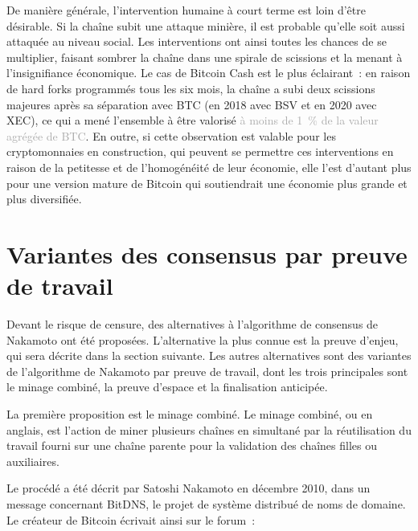 De manière générale, l'intervention humaine à court terme est loin d'être désirable. Si la chaîne subit une attaque minière, il est probable qu'elle soit aussi attaquée au niveau social. Les interventions ont ainsi toutes les chances de se multiplier, faisant sombrer la chaîne dans une spirale de scissions et la menant à l'insignifiance économique. Le cas de Bitcoin Cash est le plus éclairant~: en raison de hard forks programmés tous les six mois, la chaîne a subi deux scissions majeures après sa séparation avec BTC (en 2018 avec BSV et en 2020 avec XEC), ce qui a mené l'ensemble à être valorisé \textcolor{darkgray}{à moins de 1~\% de la valeur agrégée de BTC}. En outre, si cette observation est valable pour les cryptomonnaies en construction, qui peuvent se permettre ces interventions en raison de la petitesse et de l'homogénéité de leur économie, elle l'est d'autant plus pour une version mature de Bitcoin qui soutiendrait une économie plus grande et plus diversifiée.

\section*{Variantes des consensus par preuve de travail}

Devant le risque de censure, des alternatives à l'algorithme de consensus de Nakamoto ont été proposées. L'alternative la plus connue est la preuve d'enjeu, qui sera décrite dans la section suivante. Les autres alternatives sont des variantes de l'algorithme de Nakamoto par preuve de travail, dont les trois principales sont le minage combiné, la preuve d'espace et la finalisation anticipée. %


La première proposition est le minage combiné. Le minage combiné, ou  en anglais, est l'action de miner plusieurs chaînes en simultané par la réutilisation du travail fourni sur une chaîne parente pour la validation des chaînes filles ou auxiliaires.

Le procédé a été décrit par Satoshi Nakamoto en décembre 2010, dans un message concernant BitDNS, le projet de système distribué de noms de domaine. Le créateur de Bitcoin écrivait ainsi sur le forum~:

